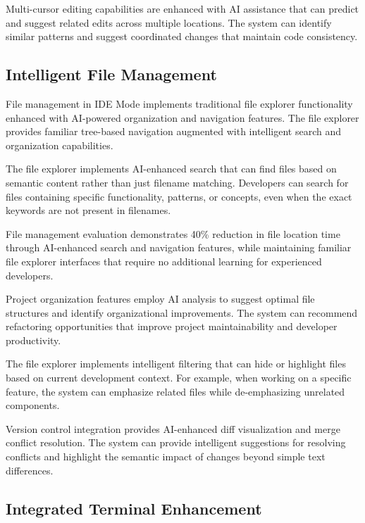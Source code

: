 Multi-cursor editing capabilities are enhanced with AI assistance that can predict and suggest related edits across multiple locations. The system can identify similar patterns and suggest coordinated changes that maintain code consistency.

\subsection*{Intelligent File Management}

File management in IDE Mode implements traditional file explorer functionality enhanced with AI-powered organization and navigation features. The file explorer provides familiar tree-based navigation augmented with intelligent search and organization capabilities.

The file explorer implements AI-enhanced search that can find files based on semantic content rather than just filename matching. Developers can search for files containing specific functionality, patterns, or concepts, even when the exact keywords are not present in filenames.

\begin{alertbox}
File management evaluation demonstrates 40\% reduction in file location time through AI-enhanced search and navigation features, while maintaining familiar file explorer interfaces that require no additional learning for experienced developers.
\end{alertbox}

Project organization features employ AI analysis to suggest optimal file structures and identify organizational improvements. The system can recommend refactoring opportunities that improve project maintainability and developer productivity.

The file explorer implements intelligent filtering that can hide or highlight files based on current development context. For example, when working on a specific feature, the system can emphasize related files while de-emphasizing unrelated components.

Version control integration provides AI-enhanced diff visualization and merge conflict resolution. The system can provide intelligent suggestions for resolving conflicts and highlight the semantic impact of changes beyond simple text differences.

\subsection*{Integrated Terminal Enhancement}

